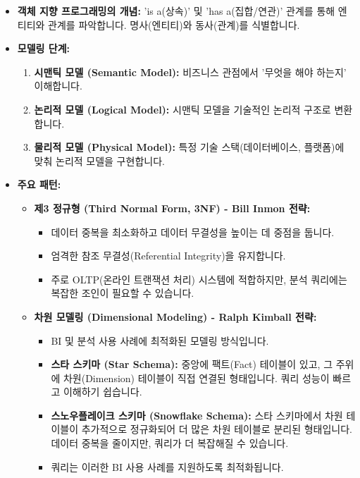 \documentclass[11pt,a4paper]{article}
\begin{document}
\begin{itemize}
    \item \textbf{객체 지향 프로그래밍의 개념:} 'is a(상속)' 및 'has a(집합/연관)' 관계를 통해 엔티티와 관계를 파악합니다. 명사(엔티티)와 동사(관계)를 식별합니다.
    \item \textbf{모델링 단계:}
    \begin{enumerate}
        \item \textbf{시맨틱 모델 (Semantic Model):} 비즈니스 관점에서 '무엇을 해야 하는지' 이해합니다.
        \item \textbf{논리적 모델 (Logical Model):} 시맨틱 모델을 기술적인 논리적 구조로 변환합니다.
        \item \textbf{물리적 모델 (Physical Model):} 특정 기술 스택(데이터베이스, 플랫폼)에 맞춰 논리적 모델을 구현합니다.
    \end{enumerate}
    \item \textbf{주요 패턴:}
    \begin{itemize}
        \item \textbf{제3 정규형 (Third Normal Form, 3NF) - Bill Inmon 전략:}
        \begin{itemize}
            \item 데이터 중복을 최소화하고 데이터 무결성을 높이는 데 중점을 둡니다.
            \item 엄격한 참조 무결성(Referential Integrity)을 유지합니다.
            \item 주로 OLTP(온라인 트랜잭션 처리) 시스템에 적합하지만, 분석 쿼리에는 복잡한 조인이 필요할 수 있습니다.
        \end{itemize}
        \item \textbf{차원 모델링 (Dimensional Modeling) - Ralph Kimball 전략:}
        \begin{itemize}
            \item BI 및 분석 사용 사례에 최적화된 모델링 방식입니다.
            \item \textbf{스타 스키마 (Star Schema):} 중앙에 팩트(Fact) 테이블이 있고, 그 주위에 차원(Dimension) 테이블이 직접 연결된 형태입니다. 쿼리 성능이 빠르고 이해하기 쉽습니다.
            \item \textbf{스노우플레이크 스키마 (Snowflake Schema):} 스타 스키마에서 차원 테이블이 추가적으로 정규화되어 더 많은 차원 테이블로 분리된 형태입니다. 데이터 중복을 줄이지만, 쿼리가 더 복잡해질 수 있습니다.
            \item 쿼리는 이러한 BI 사용 사례를 지원하도록 최적화됩니다.
        \end{itemize}

\end{itemize}
\end{itemize}
\end{document}
